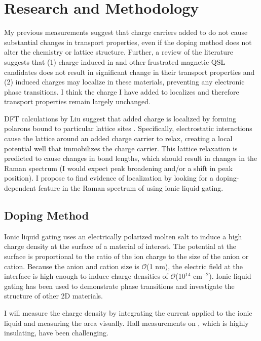 \documentclass[11pt]{article}
\begin{document}
\section{Research and Methodology}

My previous measurements suggest that charge carriers added to \rucl do not cause substantial changes in transport properties, even if the doping method does not alter the chemistry or lattice structure. Further, a review of the literature suggests that (1) charge induced in \rucl and other frustrated magnetic QSL candidates does not result in significant change in their transport properties and (2) induced charges may localize in these materials, preventing any electronic phase transitions. I think the charge I have added to \rucl localizes and therefore transport properties remain largely unchanged.

DFT calculations by Liu suggest that added charge is localized by forming polarons bound to particular lattice sites \cite{Liu2018}. Specifically, electrostatic interactions cause the lattice around an added charge carrier to relax, creating a local potential well that immobilizes the charge carrier. This lattice relaxation is predicted to cause changes in bond lengths, which should result in changes in the Raman spectrum (I would expect peak broadening and/or a shift in peak position). I propose to find evidence of localization by looking for a doping-dependent feature in the Raman spectrum of \rucl using ionic liquid gating.

\subsection{Doping Method}

Ionic liquid gating uses an electrically polarized molten salt to induce a high charge density at the surface of a material of interest. The potential at the surface is proportional to the ratio of the ion charge to the size of the anion or cation. Because the anion and cation size is $\mathcal{O}$(1 nm), the electric field at the interface is high enough to induce charge densities of $\mathcal{O}$(10$^{14}$ cm$^{-2}$). Ionic liquid gating has been used to demonstrate phase transitions and investigate the structure of other 2D materials\cite{Braga2012,Ueno2008}.

I will measure the charge density by integrating the current applied to the ionic liquid and measuring the area visually. Hall measurements on \ruclnospace, which is highly insulating, have been challenging.
\end{document}
